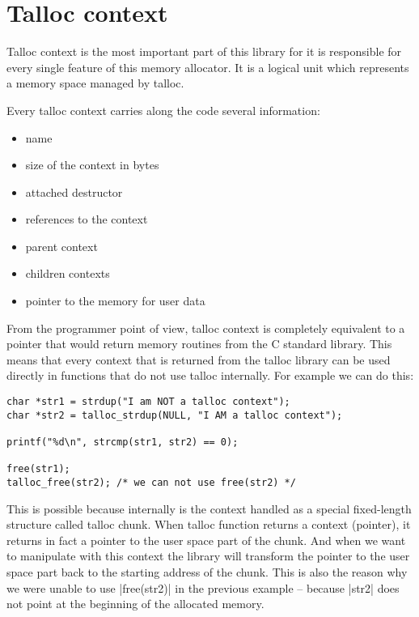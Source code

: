 \section{Talloc context}
\label{talloc:sec:context}

Talloc context is the most important part of this library for it is responsible
for every single feature of this memory allocator. It is a logical unit which
represents a memory space managed by talloc.

Every talloc context carries along the code several information:

\begin{itemize}
  \item name
  \item size of the context in bytes
  \item attached destructor
  \item references to the context
  \item parent context
  \item children contexts
  \item pointer to the memory for user data
\end{itemize}

From the programmer point of view, talloc context is completely equivalent to a
pointer that would return memory routines from the C standard library. This
means that every context that is returned from the talloc library can be used
directly in functions that do not use talloc internally. For example we can do
this:

\begin{lstlisting}
char *str1 = strdup("I am NOT a talloc context");
char *str2 = talloc_strdup(NULL, "I AM a talloc context");

printf("%d\n", strcmp(str1, str2) == 0);

free(str1);
talloc_free(str2); /* we can not use free(str2) */
\end{lstlisting}

This is possible because internally is the context handled as a special
fixed-length structure called talloc chunk. When talloc function returns
a context (pointer), it returns in fact a pointer to the user space part of the
chunk. And when we want to manipulate with this context the library will
transform the pointer to the user space part back to the starting address of the
chunk. This is also the reason why we were unable to use |free(str2)| in the
previous example -- because  |str2| does not point at the beginning of the
allocated memory.

